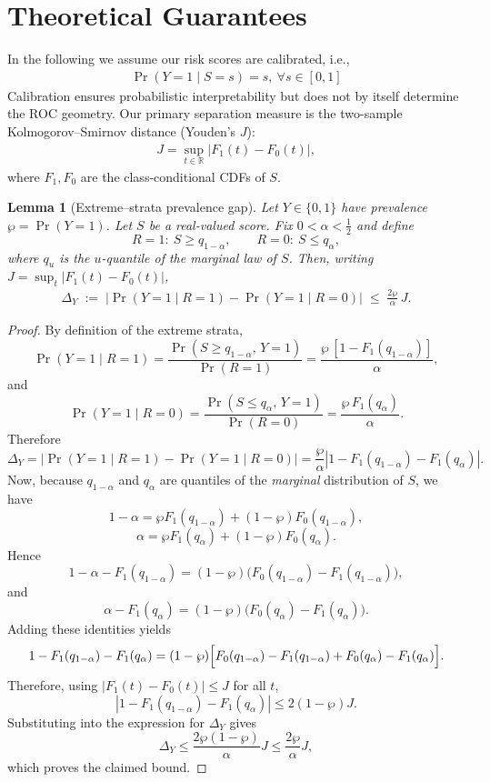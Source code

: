 \documentclass[pdflatex,sn-mathphys-num]{sn-jnl}%
\def\EQSP{3pt}
\newcommand{\cgather}[2][\EQSP]{\begingroup\setlength\abovedisplayskip{#1}\setlength\belowdisplayskip{#1}\begin{gather} #2 \end{gather}\endgroup\noindent}
\theoremstyle{thmstyleone}%
\newtheorem{lemma}[theorem]{Lemma} %
\theoremstyle{thmstyletwo}%
\theoremstyle{thmstylethree}%
\begin{document}
\section{Theoretical Guarantees}
In the following we assume our risk scores are calibrated,
i.e.,
\cgather{\label{eqcalib}
  \Pr(Y=1\mid S=s)=s,\ \forall s\in[0,1]}
Calibration ensures probabilistic interpretability but does not by itself determine
the ROC geometry. Our primary separation measure is the two-sample
Kolmogorov–Smirnov distance (Youden’s \(J\)):
\cgather{
J=\sup_{t\in\mathbb{R}}\big|F_1(t)-F_0(t)\big|,
}
where \(F_1,F_0\) are the class-conditional CDFs of \(S\).
%
\begin{lemma}[Extreme–strata prevalence gap]\label{lem:prevalence-gap}
Let \(Y\in\{0,1\}\) have prevalence \(\wp=\Pr(Y=1)\).
Let \(S\) be a real-valued score. Fix \(0<\alpha<\tfrac12\) and define
\[
R=1:\ S\ge q_{1-\alpha},\qquad R=0:\ S\le q_{\alpha},
\]
where \(q_u\) is the \(u\)-quantile of the \emph{marginal} law of \(S\).
Then, writing \(J=\sup_t|F_1(t)-F_0(t)|\),
\cgather{
\Delta_Y\;:=\;\big|\Pr(Y=1\mid R=1)-\Pr(Y=1\mid R=0)\big|
\;\le\;\frac{2\wp}{\alpha}\,J.
\tag{KS bound}
}
\end{lemma}
%

\begin{proof}
By definition of the extreme strata,
\[
\Pr(Y = 1 \mid R = 1)
=
\frac{\Pr(S \ge q_{1-\alpha},\, Y = 1)}{\Pr(R = 1)}
=
\frac{\wp\,[1 - F_1(q_{1-\alpha})]}{\alpha},
\]
and
\[
\Pr(Y = 1 \mid R = 0)
=
\frac{\Pr(S \le q_{\alpha},\, Y = 1)}{\Pr(R = 0)}
=
\frac{\wp\,F_1(q_{\alpha})}{\alpha}.
\]
Therefore
\[
\Delta_Y
=
\left|
\Pr(Y = 1 \mid R = 1)-\Pr(Y = 1 \mid R = 0)
\right|
=
\frac{\wp}{\alpha}
\left|
1 - F_1(q_{1-\alpha}) - F_1(q_{\alpha})
\right|.
\]
Now, because \(q_{1-\alpha}\) and \(q_\alpha\) are quantiles of the \emph{marginal}
distribution of \(S\), we have
\[
1-\alpha
=
\wp F_1(q_{1-\alpha}) + (1-\wp)F_0(q_{1-\alpha}),
\]
\[
\alpha
=
\wp F_1(q_{\alpha}) + (1-\wp)F_0(q_{\alpha}).
\]
Hence
\[
1-\alpha - F_1(q_{1-\alpha})
=
(1-\wp)\bigl(F_0(q_{1-\alpha}) - F_1(q_{1-\alpha})\bigr),
\]
and
\[
\alpha - F_1(q_{\alpha})
=
(1-\wp)\bigl(F_0(q_{\alpha}) - F_1(q_{\alpha})\bigr).
\]
Adding these identities yields
\[
1 - F_1(q_{1-\alpha}) - F_1(q_\alpha)
=
(1-\wp)\Bigl[
F_0(q_{1-\alpha}) - F_1(q_{1-\alpha})
+
F_0(q_\alpha) - F_1(q_\alpha)
\Bigr].
\]
Therefore, using \(|F_1(t)-F_0(t)| \le J\) for all \(t\),
\[
\left|
1 - F_1(q_{1-\alpha}) - F_1(q_\alpha)
\right|
\le 2(1-\wp)J.
\]
Substituting into the expression for \(\Delta_Y\) gives
\[
\Delta_Y
\le
\frac{2\wp(1-\wp)}{\alpha}J
\le
\frac{2\wp}{\alpha}J,
\]
which proves the claimed bound.
\end{proof}
\end{document}
